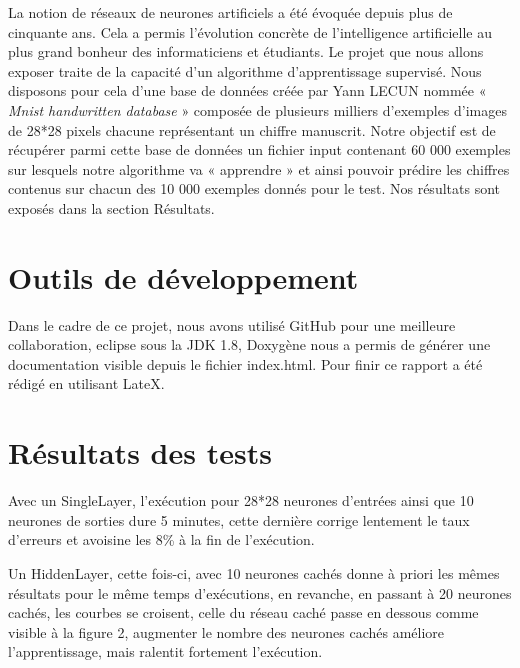 La notion de réseaux de neurones artificiels a été évoquée depuis plus de cinquante ans. Cela a permis l’évolution concrète de l’intelligence artificielle au plus grand bonheur des informaticiens et étudiants. Le projet que nous allons exposer traite de la capacité d’un algorithme d’apprentissage supervisé. \newline  \newline
Nous disposons pour cela d’une base de données créée par Yann \textsc{LECUN} nommée « \textit {Mnist handwritten database} » composée de plusieurs milliers d’exemples d’images de 28*28 pixels chacune représentant un chiffre manuscrit. \newline
Notre objectif est de récupérer parmi cette base de données un fichier input contenant 60 000 exemples sur lesquels notre algorithme va « apprendre » et ainsi pouvoir prédire les chiffres contenus sur chacun des 10 000 exemples donnés pour le test.\newline \newline 
Nos résultats sont exposés dans la section Résultats. 


\section{Outils de développement}

Dans le cadre de ce projet, nous avons utilisé GitHub pour une meilleure collaboration, eclipse sous la JDK 1.8, Doxygène nous a permis de générer une documentation visible depuis le fichier index.html. \newline Pour finir ce rapport a été rédigé en utilisant LateX.



\section{Résultats des tests}

Avec un SingleLayer, l'exécution pour 28*28 neurones d'entrées ainsi que 10 neurones de sorties dure 5 minutes, cette dernière corrige lentement le taux d'erreurs et avoisine les 8\%
 à la fin de l'exécution. \newline

Un HiddenLayer, cette fois-ci, avec 10 neurones cachés donne à priori les mêmes résultats pour le même temps d'exécutions, en revanche, en passant à 20 neurones cachés, les courbes se croisent, celle du réseau caché passe en dessous comme visible à la figure 2, augmenter le nombre des neurones cachés améliore l'apprentissage, mais ralentit fortement l'exécution.\newline

